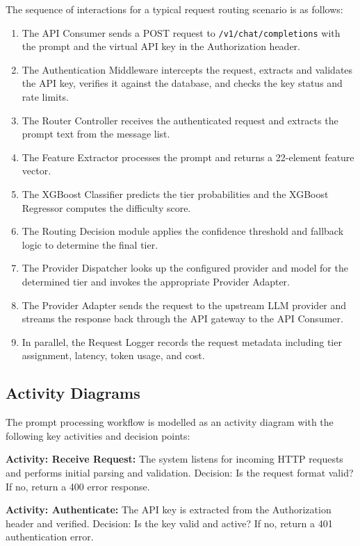 \documentclass[oneside,12pt,a4paper]{report}
\begin{document}
The sequence of interactions for a typical request routing scenario is as follows:

\begin{enumerate}
  \item The API Consumer sends a POST request to \texttt{/v1/chat/completions} with the prompt and the virtual API key in the Authorization header.
  \item The Authentication Middleware intercepts the request, extracts and validates the API key, verifies it against the database, and checks the key status and rate limits.
  \item The Router Controller receives the authenticated request and extracts the prompt text from the message list.
  \item The Feature Extractor processes the prompt and returns a 22-element feature vector.
  \item The XGBoost Classifier predicts the tier probabilities and the XGBoost Regressor computes the difficulty score.
  \item The Routing Decision module applies the confidence threshold and fallback logic to determine the final tier.
  \item The Provider Dispatcher looks up the configured provider and model for the determined tier and invokes the appropriate Provider Adapter.
  \item The Provider Adapter sends the request to the upstream LLM provider and streams the response back through the API gateway to the API Consumer.
  \item In parallel, the Request Logger records the request metadata including tier assignment, latency, token usage, and cost.
\end{enumerate}

\subsection{Activity Diagrams}

The prompt processing workflow is modelled as an activity diagram with the following key activities and decision points:

\textbf{Activity: Receive Request:} The system listens for incoming HTTP requests and performs initial parsing and validation. Decision: Is the request format valid? If no, return a 400 error response.

\textbf{Activity: Authenticate:} The API key is extracted from the Authorization header and verified. Decision: Is the key valid and active? If no, return a 401 authentication error.
\end{document}
